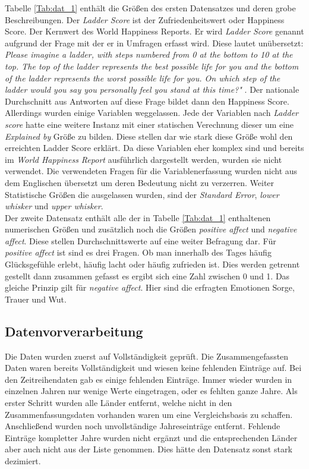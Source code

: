 Tabelle \ref{Tab:dat_1} enthält die Größen des ersten Datensatzes und deren grobe Beschreibungen. Der \textit{Ladder Score} ist der Zufriedenheitswert oder Happiness Score. Der Kernwert des World Happiness Reports. Er wird \textit{Ladder Score} genannt aufgrund der Frage mit der er in Umfragen erfasst wird. Diese lautet unübersetzt: \textit{Please imagine a ladder, with steps numbered from 0 at the
bottom to 10 at the top. The top of the ladder represents the best possible life
for you and the bottom of the ladder represents the worst possible life for you.
On which step of the ladder would you say you personally feel you stand at this
time?"} \cite{helliwell_world_2021}. Der nationale Durchschnitt aus Antworten auf diese Frage bildet dann den Happiness Score. \\

Allerdings wurden einige Variablen weggelassen. Jede der Variablen nach \textit{Ladder score} hatte eine weitere Instanz mit einer statischen Verechnung dieser um eine \textit{Explained by} Größe zu bilden. Diese stellen dar wie stark diese Größe wohl den erreichten Ladder Score erklärt. Da diese Variablen eher komplex sind und bereits im \textit{World Happiness Report}  ausführlich dargestellt werden, wurden sie nicht verwendet. Die verwendeten Fragen für die Variablenerfassung wurden nicht aus dem Englischen übersetzt um deren Bedeutung nicht zu verzerren. Weiter Statistische Größen die ausgelassen wurden, sind der \textit{Standard Error}, \textit{lower whisker} und \textit{upper whisker}. \\

Der zweite Datensatz enthält alle der in Tabelle \ref{Tab:dat_1} enthaltenen numerischen Größen und zusätzlich noch die Größen \textit{positive affect} und \textit{negative affect}. Diese stellen Durchschnittswerte auf eine weiter Befragung dar. Für \textit{positive affect} ist sind es drei Fragen. Ob man innerhalb des Tages häufig Glücksgefühle erlebt, häufig lacht oder häufig zufrieden ist. Dies werden getrennt gestellt dann zusammen gefasst es ergibt sich eine Zahl zwischen 0 und 1. Das gleiche Prinzip gilt für \textit{negative affect}. Hier sind die erfragten Emotionen Sorge, Trauer und Wut. 

\subsection{Datenvorverarbeitung}

Die Daten wurden zuerst auf Vollständigkeit geprüft. Die Zusammengefassten Daten waren bereits Vollständigkeit und wiesen keine fehlenden Einträge auf. Bei den Zeitreihendaten gab es einige fehlenden Einträge. Immer wieder wurden in einzelnen Jahren nur wenige Werte eingetragen, oder es fehlten ganze Jahre. Als erster Schritt wurden alle Länder entfernt, welche nicht in den Zusammenfassungsdaten vorhanden waren um eine Vergleichsbasis zu schaffen. Anschließend wurden noch unvollständige Jahreseinträge entfernt. Fehlende Einträge kompletter Jahre wurden nicht ergänzt und die entsprechenden Länder aber auch nicht aus der Liste genommen. Dies hätte den Datensatz sonst stark dezimiert. \\

